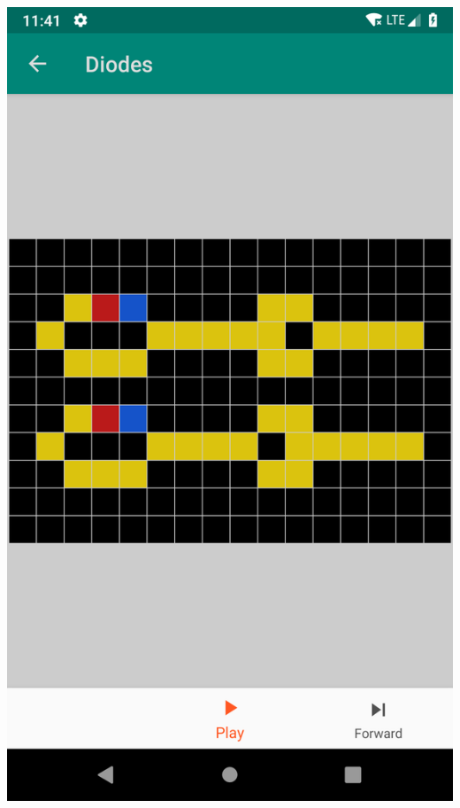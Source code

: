 \documentclass{report}
\begin{document}
\begin{minipage}{.45\textwidth}
  \begin{minipage}{.45\linewidth}
    \includegraphics[width=\linewidth]{screens/wireworld.png}
  \end{minipage}\hfill
  \begin{minipage}{.45\linewidth}

\end{minipage}
\end{minipage}
\end{document}
